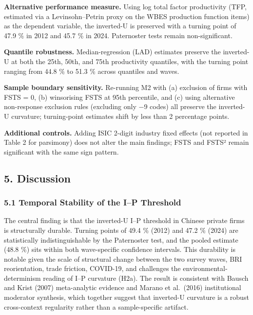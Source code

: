 \documentclass[
  12pt,a4paper]{article}
\begin{document}
\textbf{Alternative performance measure.} Using log total factor
productivity (TFP, estimated via a Levinsohn--Petrin proxy on the WBES
production function items) as the dependent variable, the inverted-U is
preserved with a turning point of 47.9 \% in 2012 and 45.7 \% in 2024.
Paternoster tests remain non-significant.

\textbf{Quantile robustness.} Median-regression (LAD) estimates preserve
the inverted-U at both the 25th, 50th, and 75th productivity quantiles,
with the turning point ranging from 44.8 \% to 51.3 \% across quantiles
and waves.

\textbf{Sample boundary sensitivity.} Re-running M2 with (a) exclusion
of firms with FSTS = 0, (b) winsorising FSTS at 95th percentile, and (c)
using alternative non-response exclusion rules (excluding only −9 codes)
all preserve the inverted-U curvature; turning-point estimates shift by
less than 2 percentage points.

\textbf{Additional controls.} Adding ISIC 2-digit industry fixed effects
(not reported in Table 2 for parsimony) does not alter the main
findings; FSTS and FSTS² remain significant with the same sign pattern.

\hypertarget{discussion}{%
\subsection{5. Discussion}\label{discussion}}

\hypertarget{temporal-stability-of-the-ip-threshold}{%
\subsubsection{5.1 Temporal Stability of the I--P
Threshold}\label{temporal-stability-of-the-ip-threshold}}

The central finding is that the inverted-U I--P threshold in Chinese
private firms is structurally durable. Turning points of 49.4 \% (2012)
and 47.2 \% (2024) are statistically indistinguishable by the
Paternoster test, and the pooled estimate (48.8 \%) sits within both
wave-specific confidence intervals. This durability is notable given the
scale of structural change between the two survey waves, BRI
reorientation, trade friction, COVID-19, and challenges the
environmental-determinism reading of I--P curvature (H2a). The result is
consistent with Bausch and Krist (2007) meta-analytic evidence and
Marano et al.~(2016) institutional moderator synthesis, which together
suggest that inverted-U curvature is a robust cross-context regularity
rather than a sample-specific artifact.
\end{document}
